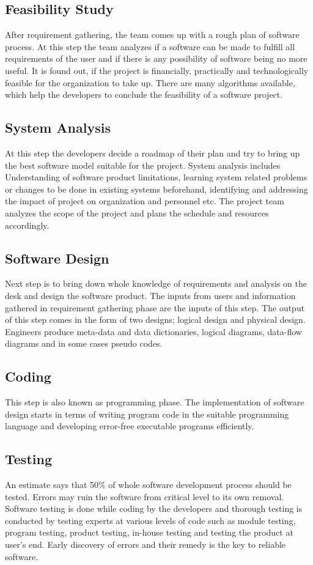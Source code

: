 \documentclass[11pt]{article}
\begin{document}
\subsection{Feasibility Study}
After requirement gathering, the team comes up with a rough plan of software process. At this step the team analyzes if a software can be made to fulfill all requirements of the user and if there is any possibility of software being no more useful. It is found out, if the project is financially, practically and technologically feasible for the organization to take up. There are many algorithms available, which help the developers to conclude the feasibility of a software project.
\subsection{System Analysis}
At this step the developers decide a roadmap of their plan and try to bring up the best software model suitable for the project. System analysis includes Understanding of software product limitations, learning system related problems or changes to be done in existing systems beforehand, identifying and addressing the impact of project on organization and personnel etc. The project team analyzes the scope of the project and plans the schedule and resources accordingly.
\subsection{Software Design}
Next step is to bring down whole knowledge of requirements and analysis on the desk and design the software product. The inputs from users and information gathered in requirement gathering phase are the inputs of this step. The output of this step comes in the form of two designs; logical design and physical design. Engineers produce meta-data and data dictionaries, logical diagrams, data-flow diagrams and in some cases pseudo codes.
\subsection{Coding}
This step is also known as programming phase. The implementation of software design starts in terms of writing program code in the suitable programming language and developing error-free executable programs efficiently.
\subsection{Testing}
An estimate says that 50\% of whole software development process should be tested. Errors may ruin the software from critical level to its own removal. Software testing is done while coding by the developers and thorough testing is conducted by testing experts at various levels of code such as module testing, program testing, product testing, in-house testing and testing the product at user’s end. Early discovery of errors and their remedy is the key to reliable software.
\end{document}

